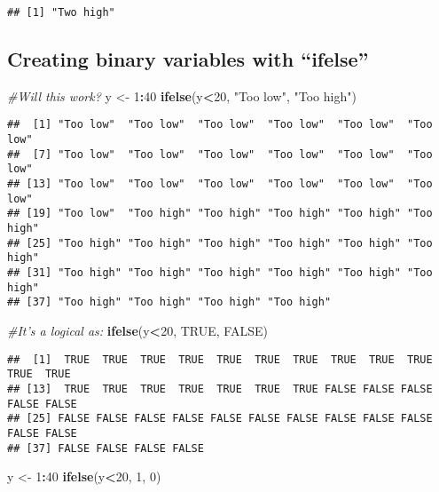 \documentclass[
]{article}
\newenvironment{Shaded}{\begin{snugshade}}{\end{snugshade}}
\newcommand{\CommentTok}[1]{\textcolor[rgb]{0.56,0.35,0.01}{\textit{#1}}}
\newcommand{\ConstantTok}[1]{\textcolor[rgb]{0.56,0.35,0.01}{#1}}
\newcommand{\DecValTok}[1]{\textcolor[rgb]{0.00,0.00,0.81}{#1}}
\newcommand{\FunctionTok}[1]{\textcolor[rgb]{0.13,0.29,0.53}{\textbf{#1}}}
\newcommand{\NormalTok}[1]{#1}
\newcommand{\OtherTok}[1]{\textcolor[rgb]{0.56,0.35,0.01}{#1}}
\newcommand{\SpecialCharTok}[1]{\textcolor[rgb]{0.81,0.36,0.00}{\textbf{#1}}}
\newcommand{\StringTok}[1]{\textcolor[rgb]{0.31,0.60,0.02}{#1}}
\begin{document}
\begin{verbatim}
## [1] "Two high"
\end{verbatim}

\subsection{Creating binary variables with
``ifelse''}\label{creating-binary-variables-with-ifelse}

\begin{Shaded}
\begin{Highlighting}[]
\CommentTok{\#Will this work?}
\NormalTok{y }\OtherTok{\textless{}{-}} \DecValTok{1}\SpecialCharTok{:}\DecValTok{40}
\FunctionTok{ifelse}\NormalTok{(y}\SpecialCharTok{\textless{}}\DecValTok{20}\NormalTok{, }\StringTok{"Too low"}\NormalTok{, }\StringTok{"Too high"}\NormalTok{)}
\end{Highlighting}
\end{Shaded}

\begin{verbatim}
##  [1] "Too low"  "Too low"  "Too low"  "Too low"  "Too low"  "Too low" 
##  [7] "Too low"  "Too low"  "Too low"  "Too low"  "Too low"  "Too low" 
## [13] "Too low"  "Too low"  "Too low"  "Too low"  "Too low"  "Too low" 
## [19] "Too low"  "Too high" "Too high" "Too high" "Too high" "Too high"
## [25] "Too high" "Too high" "Too high" "Too high" "Too high" "Too high"
## [31] "Too high" "Too high" "Too high" "Too high" "Too high" "Too high"
## [37] "Too high" "Too high" "Too high" "Too high"
\end{verbatim}

\begin{Shaded}
\begin{Highlighting}[]
\CommentTok{\#It’s a logical as:}
\FunctionTok{ifelse}\NormalTok{(y}\SpecialCharTok{\textless{}}\DecValTok{20}\NormalTok{, }\ConstantTok{TRUE}\NormalTok{, }\ConstantTok{FALSE}\NormalTok{)}
\end{Highlighting}
\end{Shaded}

\begin{verbatim}
##  [1]  TRUE  TRUE  TRUE  TRUE  TRUE  TRUE  TRUE  TRUE  TRUE  TRUE  TRUE  TRUE
## [13]  TRUE  TRUE  TRUE  TRUE  TRUE  TRUE  TRUE FALSE FALSE FALSE FALSE FALSE
## [25] FALSE FALSE FALSE FALSE FALSE FALSE FALSE FALSE FALSE FALSE FALSE FALSE
## [37] FALSE FALSE FALSE FALSE
\end{verbatim}

\begin{Shaded}
\begin{Highlighting}[]
\NormalTok{y }\OtherTok{\textless{}{-}} \DecValTok{1}\SpecialCharTok{:}\DecValTok{40}
\FunctionTok{ifelse}\NormalTok{(y}\SpecialCharTok{\textless{}}\DecValTok{20}\NormalTok{, }\DecValTok{1}\NormalTok{, }\DecValTok{0}\NormalTok{)}
\end{Highlighting}
\end{Shaded}
\end{document}
